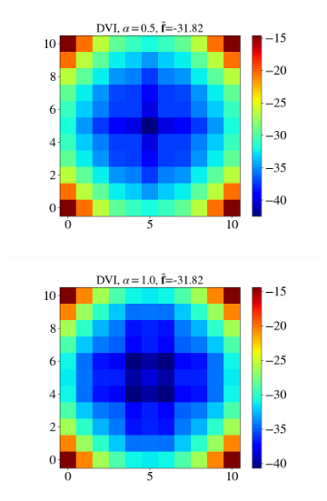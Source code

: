 \begin{itemize}
\begin{figure}[H]
\begin{subfigure}{0.32\columnwidth}
			\includegraphics[width=1.0\textwidth]{images/CD/Example7/10/N_11_DVI_0.5.png}
		\end{subfigure}
		\begin{subfigure}{0.32\columnwidth}	
			\centering
			\includegraphics[width=1.0\textwidth]{images/CD/Example7/10/N_11_DVI_1.0.png}
		\end{subfigure}
		\begin{subfigure}{0.32\columnwidth}	
			\centering

\end{subfigure}
\end{figure}
\end{itemize}

